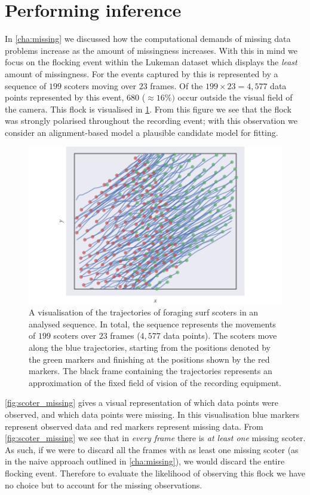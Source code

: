 \section{Performing inference}

In \cref{cha:missing} we discussed how the computational demands of missing
data problems increase as the amount of missingness increases. With this in
mind we focus on the flocking event within the Lukeman dataset which displays
the \emph{least} amount of missingness. For the events captured by
\textcite{lukeman10} this is represented by a sequence of $199$ scoters moving
over $23$ frames. Of the $199\times23=4,577$ data points represented by this
event, $680$ ($\approx16\%)$ occur outside the visual field of the camera. This
flock is visualised in \cref{fig:scoter_traj}. From this figure we see that the
flock was strongly polarised throughout the recording event; with this
observation we consider an alignment-based model a plausible candidate model
for fitting.

\begin{figure}[tb]
  \includegraphics{data_00_traj.pdf}
  \caption{A visualisation of the trajectories of foraging surf scoters in an
    analysed sequence. In total, the sequence represents the movements of
    $199$ scoters over $23$ frames ($4,577$ data points). The scoters move
    along the blue trajectories, starting from the positions denoted by the
    green markers and finishing at the positions shown by the red markers. The
    black frame containing the trajectories represents an approximation of the
    fixed field of vision of the recording equipment.}
  \label{fig:scoter_traj}
\end{figure}

\cref{fig:scoter_missing} gives a visual representation of which data points
were observed, and which data points were missing. In this visualisation blue
markers represent observed data and red markers represent missing data. From
\cref{fig:scoter_missing} we see that in \emph{every frame} there is \emph{at
least one} missing scoter. As such, if we were to discard all the frames with
as least one missing scoter (as in the naive approach outlined in
\cref{cha:missing}), we would discard the entire flocking event. Therefore to
evaluate the likelihood of observing this flock we have no choice but to
account for the missing observations.


